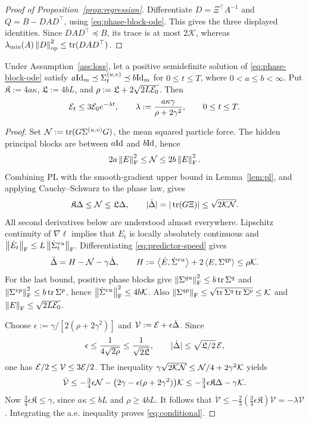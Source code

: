 \begin{proof}[Proof of Proposition~\ref{prop:regression}]
Differentiate $D=\Xi^\top A^{-1}$ and $Q=B-DAD^\top$, using
\eqref{eq:phase-block-ode}. This gives the three displayed identities.
Since $DAD^\top\preceq B$, its trace is at most $2\mathcal{K}$, whereas
$\lambda_{\min}(A)\left\lVert D \right\rVert_{\mathrm{op}}^2\le\operatorname{tr}(DAD^\top)$.
\end{proof}
\begin{lemma}\label{lem:conditional}
Under Assumption~\ref{ass:loss}, let a positive semidefinite solution of
\eqref{eq:phase-block-ode} satisfy $a\mathrm{Id}_m\preceq\Sigma^{(u,v)}_t\preceq b\mathrm{Id}_m$ for
$0\le t\le T$, where $0<a\le b<\infty$. Put
$\mathfrak K:=4a\kappa$, $\mathfrak L:=4bL$, and
$\rho:=\mathfrak L+2\sqrt{2L\mathcal E_0}$. Then
\begin{equation}\label{eq:conditional}
 \mathcal E_t\le3\mathcal E_0 e^{-\lambda t},\qquad
 \lambda:=\frac{a\kappa\gamma}{\rho+2\gamma^2},\qquad 0\le t\le T.
\end{equation}
\end{lemma}
\begin{proof}
Set $\mathcal N:=\operatorname{tr}(G\Sigma^{(u,v)} G)$, the mean squared particle force.
The hidden principal blocks are between $a\mathrm{Id}$ and $b\mathrm{Id}$, hence
\[
 2a\left\lVert E \right\rVert_{\mathrm{F}}^2\le\mathcal N\le2b\left\lVert E \right\rVert_{\mathrm{F}}^2.
\]
Combining PL with the smooth-gradient upper bound in
Lemma~\ref{lem:pl}, and applying Cauchy--Schwarz to the phase law, gives
\begin{equation}\label{eq:conditional-force-bounds}
 \mathfrak K\Delta\le \mathcal N\le\mathfrak L\Delta,\qquad
 |\dot\Delta|=|\operatorname{tr}(G\Xi)|\le\sqrt{2\mathcal{K} \mathcal N}.
\end{equation}
All second derivatives below are understood almost everywhere. Lipschitz
continuity of $\nabla\ell$ implies that $E_t$ is locally absolutely
continuous and $\left\lVert \dot E_t \right\rVert_{\mathrm{F}}\le L\left\lVert \dot{\Sigma}^{vu}_t \right\rVert_{\mathrm{F}}$.
Differentiating \eqref{eq:predictor-speed} gives
\[
 \ddot\Delta=H-\mathcal N-\gamma\dot\Delta,\qquad
 H:=\left\langle \dot E,\dot{\Sigma}^{vu} \right\rangle+2\left\langle E,\Sigma^{qp} \right\rangle\le\rho\mathcal{K}.
\]
For the last bound, positive phase blocks give
$\left\lVert \Sigma^{qu} \right\rVert_{\mathrm{F}}^2\le b\operatorname{tr}\Sigma^q$ and
$\left\lVert \Sigma^{vp} \right\rVert_{\mathrm{F}}^2\le b\operatorname{tr}\Sigma^p$, hence
$\left\lVert \dot{\Sigma}^{vu} \right\rVert_{\mathrm{F}}^2\le4b\mathcal{K}$. Also
$\left\lVert \Sigma^{qp} \right\rVert_{\mathrm{F}}\le\sqrt{\operatorname{tr}\Sigma^q\operatorname{tr}\Sigma^p}\le\mathcal{K}$ and
$\left\lVert E \right\rVert_{\mathrm{F}}\le\sqrt{2L\mathcal E_0}$.

Choose $\epsilon:=\gamma/[2(\rho+2\gamma^2)]$ and
$\mathcal V:=\mathcal E+\epsilon\dot\Delta$. Since
\[
 \epsilon\le\frac1{4\sqrt{2\rho}}
 \le\frac1{\sqrt{2\mathfrak L}},\qquad
 |\dot\Delta|\le\sqrt{\mathfrak L/2}\,\mathcal E,
\]
one has $\mathcal E/2\le\mathcal V\le3\mathcal E/2$.
The inequality $\gamma\sqrt{2\mathcal{K} \mathcal N}\le \mathcal N/4+2\gamma^2\mathcal{K}$ yields
\[
 \dot{\mathcal V}\le-\tfrac34\epsilon \mathcal N
       -\bigl(2\gamma-\epsilon(\rho+2\gamma^2)\bigr)\mathcal{K}
 \le-\tfrac34\epsilon\mathfrak K\Delta-\gamma\mathcal{K}.
\]
Now $\tfrac34\epsilon\mathfrak K\le\gamma$, since $a\kappa\le bL$
and $\rho\ge4bL$. It follows that
$\dot{\mathcal V}\le-\tfrac23(\tfrac34\epsilon\mathfrak K)\mathcal V
=-\lambda\mathcal V$.
Integrating the a.e. inequality proves \eqref{eq:conditional}.

\end{proof}

